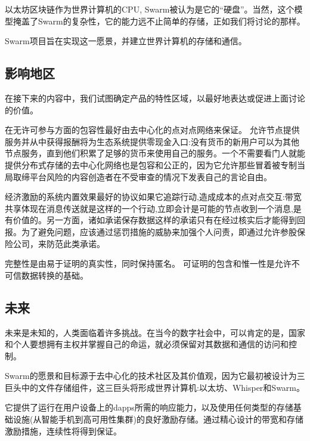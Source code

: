  
以太坊区块链作为世界计算机的CPU, Swarm被认为是它的“硬盘”。当然，这个模型掩盖了Swarm的复杂性，它的能力远不止简单的存储，正如我们将讨论的那样。

Swarm项目旨在实现这一愿景，并建立世界计算机的存储和通信。 

\subsection{影响地区\statusorange}

在接下来的内容中，我们试图确定产品的特性区域，以最好地表达或促进上面讨论的价值。 

在无许可参与方面的包容性最好由去中心化的点对点网络来保证。  
允许节点提供服务并从中获得报酬将为生态系统提供零现金入口:没有货币的新用户可以为其他节点服务，直到他们积累了足够的货币来使用自己的服务。一个不需要看门人就能提供分布式存储的去中心化网络也是包容和公正的，因为它允许那些冒着被专制当局取缔平台风险的内容创造者在不受审查的情况下发表自己的言论自由。 

经济激励的系统内置效果最好的协议如果它追踪行动,造成成本的点对点交互:带宽共享体现在消息传送就是这样的一个行动,立即会计是可能的节点收到一个消息,是有价值的。另一方面，诸如承诺保存数据这样的承诺只有在经过核实后才能得到回报。为了避免问题，应该通过惩罚措施的威胁来加强个人问责，即通过允许参股保险公司，来防范此类承诺。

完整性是由易于证明的真实性，同时保持匿名。
可证明的包含和惟一性是允许不可信数据转换的基础。


\subsection{未来} \label{sec:future}

未来是未知的，人类面临着许多挑战。在当今的数字社会中，可以肯定的是，国家和个人要想拥有主权并掌握自己的命运，就必须保留对其数据和通信的访问和控制。

Swarm的愿景和目标源于去中心化的技术社区及其价值观，因为它最初被设计为三巨头中的文件存储组件，这三巨头将形成世界计算机:以太坊、Whisper和Swarm。

它提供了运行在用户设备上的dapps所需的响应能力，以及使用任何类型的存储基础设施(从智能手机到高可用性集群)的良好激励存储。通过精心设计的带宽和存储激励措施，连续性将得到保证。

